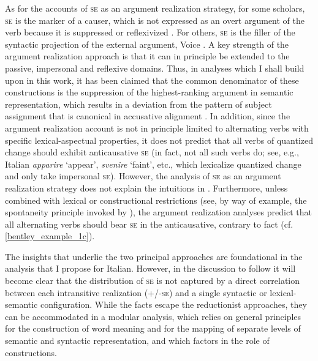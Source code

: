 \documentclass[output=paper,colorlinks,citecolor=brown
]{langscibook}
\begin{document}
As for the accounts of \textsc{se} as an argument realization strategy, for some scholars, \textsc{se} is the marker of a causer, which is not expressed as an overt argument of the verb because it is suppressed or reflexivized \citep{rothemerg1974verbes,vanvalin1990semantic,labelle1992change,cennamo1995patterns,centineo1995distribution,bentley2006split,koontz2009anticausativization}. For others, \textsc{se} is the filler of the syntactic projection of the external argument, Voice \citep{alexiadou2006properties,alexiadou2015external}. A key strength of the argument realization approach is that it can in principle be extended to the passive, impersonal and reflexive domains. Thus, in analyses which I shall build upon in this work, it has been claimed that the common denominator of these constructions is the suppression of the highest-ranking argument in semantic representation, which results in a deviation from the pattern of subject assignment that is canonical in accusative alignment \citep{vanvalin1990semantic,centineo1995distribution,bentley2006split,bentley2023internally,gonzales2006construcciones}. In addition, since the argument realization account is not in principle limited to alternating verbs with specific lexical-aspectual properties, it does not predict that all verbs of quantized change should exhibit anticausative \textsc{se} (in fact, not all such verbs do; see, e.g., Italian \textit{apparire} ‘appear’, \textit{svenire} ‘faint’, etc., which lexicalize quantized change and only take impersonal \textsc{se}). However, the analysis of \textsc{se} as an argument realization strategy does not explain the intuitions in . Furthermore, unless combined with lexical or constructional restrictions (see, by way of example, the spontaneity principle invoked by \cite[96, 114—120]{alexiadou2015external}), the argument realization analyses predict that all alternating verbs should bear \textsc{se} in the anticausative, contrary to fact (cf. \ref{bentley_example_1c}). 

The insights that underlie the two principal approaches are foundational in the analysis that I propose for Italian. However, in the discussion to follow it will become clear that the distribution of \textsc{se} is not captured by a direct correlation between each intransitive realization (+/-\textsc{se}) and a single syntactic or lexical-semantic configuration. While the facts escape the reductionist approaches, they can be accommodated in a modular analysis, which relies on general principles for the construction of word meaning and for the mapping of separate levels of semantic and syntactic representation, and which factors in the role of constructions. 
\end{document}
